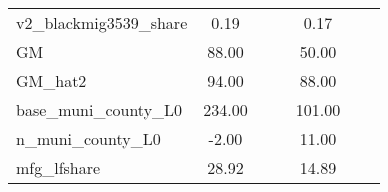 \begin{table}[htbp]
\begin{tabular}{l*{2}{ccc}}
v2\_blackmig3539\_share&        0.19&            &            &        0.17&            &            \\
GM                  &       88.00&            &            &       50.00&            &            \\
GM\_hat2             &       94.00&            &            &       88.00&            &            \\
base\_muni\_county\_L0 &      234.00&            &            &      101.00&            &            \\
n\_muni\_county\_L0    &       -2.00&            &            &       11.00&            &            \\
mfg\_lfshare         &       28.92&            &            &       14.89&            &            \\
\bottomrule
\end{tabular}
\end{table}
